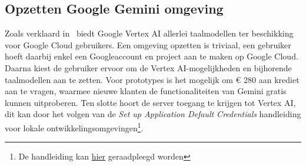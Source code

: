 \subsection{Opzetten Google Gemini omgeving}
\label{subsec:opzetten-google-gemini-omgeving}
Zoals verklaard in~ biedt Google Vertex AI allerlei taalmodellen ter beschikking voor Google Cloud gebruikers.
Een omgeving opzetten is triviaal, een gebruiker hoeft daarbij enkel een Googleaccount en project aan te maken op Google Cloud.
Daarna kiest de gebruiker ervoor om de Vertex AI-mogelijkheden en bijhorende taalmodellen aan te zetten.
Voor prototypes is het mogelijk om € 280 aan krediet aan te vragen, waarmee nieuwe klanten de functionaliteiten van Gemini gratis kunnen uitproberen.
Ten slotte hoort de server toegang te krijgen tot Vertex AI, dit kan door het volgen van de \textit{Set up Application Default Credentials} handleiding voor lokale ontwikkelingsomgevingen\footnote{De handleiding kan \href{https://cloud.google.com/docs/authentication/provide-credentials-adc#local-dev}{hier} geraadpleegd worden}.

